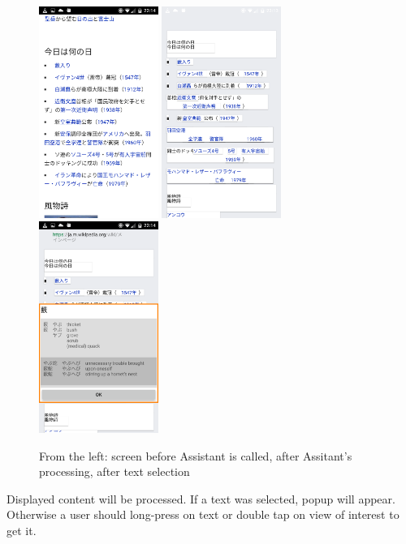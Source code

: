\documentclass[11pt,a4paper]{article}
\begin{document}
\begin{figure}[h]
\includegraphics[width=110pt]{screen_3.png}
\includegraphics[width=110pt]{screen_1.png}
\includegraphics[width=110pt]{screen_2.png}

From the left: screen before Assistant is called, after Assitant's processing, after text selection
\end{figure}

Displayed content will be processed. If a text was selected, popup will appear.
Otherwise a user should long-press on text or double tap on view of interest
to get it.
\end{document}
